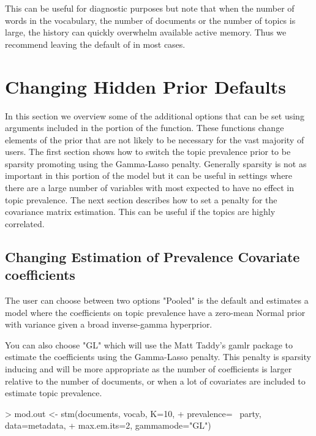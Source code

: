 \documentclass[nojss]{jss}
\begin{document}
This can be useful for diagnostic purposes but note that when the number of words in the vocabulary, the number of documents or the number of topics is large, the history can quickly overwhelm available active memory. Thus we recommend leaving the default of  in most cases.

\section{Changing Hidden Prior Defaults}

In this section we overview some of the additional options that can be set using arguments included in the  portion of the   function.  These functions change elements of the prior that are not likely to be necessary for the vast majority of users.  The first section shows how to switch the topic prevalence prior to be sparsity promoting using the Gamma-Lasso penalty.  Generally sparsity is not as important in this portion of the model but it can be useful in settings where there are a large number of variables with most expected to have no effect in topic prevalence.  The next section describes how to set a penalty for the covariance matrix estimation.  This can be useful if the topics are highly correlated.

\subsection{Changing Estimation of Prevalence Covariate coefficients}

The user can choose between two options "Pooled" is the default and estimates a model
 where the coefficients on topic prevalence have a zero-mean Normal prior with variance given a broad
 inverse-gamma hyperprior.

You can also choose "GL" which will use the Matt Taddy's gamlr package to estimate the coefficients
 using the Gamma-Lasso penalty.  This penalty is sparsity inducing and will be more appropriate as the
 number of coefficients is larger relative to the number of documents, or when a lot of covariates are included to estimate topic prevalence.

\begin{Schunk}
\begin{Sinput}
> mod.out <- stm(documents, vocab, K=10,
+                prevalence= ~party, data=metadata,
+                max.em.its=2, gammamode="GL")
\end{Sinput}
\end{Schunk}
\end{document}
